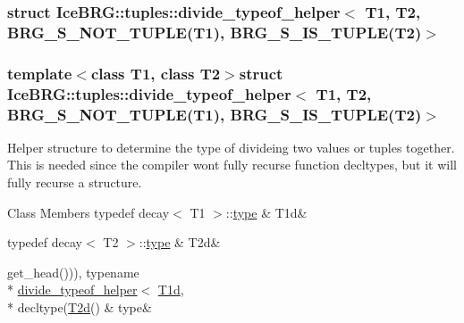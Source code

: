 \subsubsection{struct Ice\+B\+R\+G\+:\+:tuples\+:\+:divide\+\_\+typeof\+\_\+helper$<$ T1, T2, B\+R\+G\+\_\+\+S\+\_\+\+N\+O\+T\+\_\+\+T\+U\+P\+L\+E(T1), B\+R\+G\+\_\+\+S\+\_\+\+I\+S\+\_\+\+T\+U\+P\+L\+E(T2)$>$}
\subsubsection*{template$<$class T1, class T2$>$struct Ice\+B\+R\+G\+::tuples\+::divide\+\_\+typeof\+\_\+helper$<$ T1, T2, B\+R\+G\+\_\+\+S\+\_\+\+N\+O\+T\+\_\+\+T\+U\+P\+L\+E(\+T1), B\+R\+G\+\_\+\+S\+\_\+\+I\+S\+\_\+\+T\+U\+P\+L\+E(\+T2)$>$}

Helper structure to determine the type of divideing two values or tuples together. This is needed since the compiler won\textquotesingle{}t fully recurse function decltypes, but it will fully recurse a structure. \begin{DoxyFields}{Class Members}
\hypertarget{namespaceIceBRG_1_1tuples_a33ba3919709592010628fa1516bd3b7b}{}typedef decay$<$ T1 $>$\+::\hyperlink{namespaceIceBRG_1_1tuples_a94b4388c855c8a54d726c4045d1c1059}{type}\label{namespaceIceBRG_1_1tuples_a33ba3919709592010628fa1516bd3b7b}
&
T1d&
\\
\hline

\hypertarget{namespaceIceBRG_1_1tuples_a89ddecb81b091b33f9c2d07a9f6370a8}{}typedef decay$<$ T2 $>$\+::\hyperlink{namespaceIceBRG_1_1tuples_a94b4388c855c8a54d726c4045d1c1059}{type}\label{namespaceIceBRG_1_1tuples_a89ddecb81b091b33f9c2d07a9f6370a8}
&
T2d&
\\
\hline

\hypertarget{namespaceIceBRG_1_1tuples_a94b4388c855c8a54d726c4045d1c1059}{}get\+\_\+head())), typename \\*
\hyperlink{namespaceIceBRG_1_1tuples_structIceBRG_1_1tuples_1_1divide__typeof__helper}{divide\+\_\+typeof\+\_\+helper}$<$ \hyperlink{namespaceIceBRG_1_1tuples_a33ba3919709592010628fa1516bd3b7b}{T1d}, \\*
decltype(\hyperlink{namespaceIceBRG_1_1tuples_a89ddecb81b091b33f9c2d07a9f6370a8}{T2d}()\label{namespaceIceBRG_1_1tuples_a94b4388c855c8a54d726c4045d1c1059}
&
type&
\\
\hline

\end{DoxyFields}
\label{structIceBRG_1_1tuples_1_1ipow__typeof__helper}
\hypertarget{namespaceIceBRG_1_1tuples_structIceBRG_1_1tuples_1_1ipow__typeof__helper}{}
